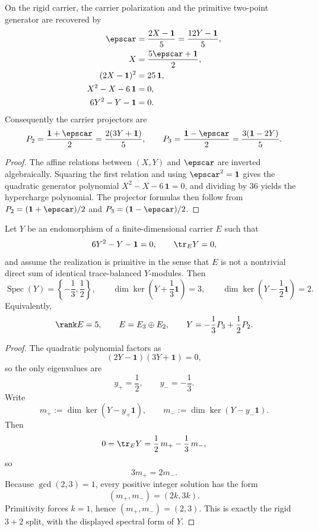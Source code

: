 \begin{lemma}
On the rigid carrier, the carrier polarization and the primitive two-point generator are recovered by
\begin{align}
\epscar&=\frac{2X-\mathbf 1}{5}=\frac{12Y-\mathbf 1}{5},
\label{eq:hypercharge-seam-inversion}\\
\qquad
X&=\frac{5\epscar+\mathbf 1}{2},
\nonumber\\
(2X-\mathbf 1)^2&=25\,\mathbf 1,
\nonumber\\
X^2-X-6\,\mathbf 1&=0,
\nonumber\\
6Y^2-Y-\mathbf 1&=0.
\label{eq:carrier-polynomial}
\end{align}
Consequently the carrier projectors are
\[
P_2=\frac{\mathbf 1+\epscar}{2}=\frac{2(3Y+\mathbf 1)}{5},
\qquad
P_3=\frac{\mathbf 1-\epscar}{2}=\frac{3(\mathbf 1-2Y)}{5}.
\]
\end{lemma}

\begin{proof}
The affine relations between $(X,Y)$ and $\epscar$ are inverted algebraically. Squaring the first
relation and using $\epscar^2=\mathbf 1$ gives the quadratic generator polynomial
$X^2-X-6\,\mathbf 1=0$, and dividing by $36$ yields the hypercharge polynomial. The projector
formulas then follow from $P_2=(\mathbf 1+\epscar)/2$ and $P_3=(\mathbf 1-\epscar)/2$.
\end{proof}

\begin{lemma}
\label{lem:primitive-trace-balanced-carrier}
Let $Y$ be an endomorphism of a finite-dimensional carrier $E$ such that
\[
6Y^2-Y-\mathbf 1=0,
\qquad
\tr_EY=0,
\]
and assume the realization is primitive in the sense that $E$ is not a nontrivial direct sum of
identical trace-balanced $Y$-modules. Then
\[
\operatorname{Spec}(Y)=\left\{-\frac13,\frac12\right\},
\qquad
\dim\ker\!\left(Y+\frac13\mathbf 1\right)=3,
\qquad
\dim\ker\!\left(Y-\frac12\mathbf 1\right)=2.
\]
Equivalently,
\[
\rank E=5,
\qquad
E=E_3\oplus E_2,
\qquad
Y=-\frac13P_3+\frac12P_2.
\]
\end{lemma}

\begin{proof}
The quadratic polynomial factors as
\[
(2Y-\mathbf 1)(3Y+\mathbf 1)=0,
\]
so the only eigenvalues are
\[
y_+=\frac12,
\qquad
y_-=-\frac13.
\]
Write
\[
m_+:=\dim\ker(Y-y_+\mathbf 1),
\qquad
m_-:=\dim\ker(Y-y_-\mathbf 1).
\]
Then
\[
0=\tr_EY=\frac12\,m_+-\frac13\,m_-,
\]
so
\[
3m_+=2m_-.
\]
Because $\gcd(2,3)=1$, every positive integer solution has the form
\[
(m_+,m_-)=(2k,3k).
\]
Primitivity forces $k=1$, hence $(m_+,m_-)=(2,3)$. This is exactly the rigid $3+2$ split, with
the displayed spectral form of $Y$.
\end{proof}

